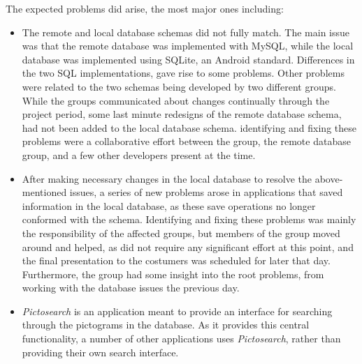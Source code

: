 The expected problems did arise, the most major ones including:
\begin{itemize}
	\item The remote and local database schemas did not fully match. The main issue was that the remote database was implemented with MySQL, while the local database was implemented using SQLite, an Android standard. Differences in the two SQL implementations, gave rise to some problems. Other problems were related to the two schemas being developed by two different groups. While the groups communicated about changes continually through the project period, some last minute redesigns of the remote database schema, had not been added to the local database schema. identifying and fixing these problems were a collaborative effort between the \launcher group, the remote database group, and a few other developers present at the time. 
	\item After making necessary changes in the local database to resolve the above-mentioned issues, a series of new problems arose in applications that saved information in the local database, as these save operations no longer conformed with the schema. Identifying and fixing these problems was mainly the responsibility of the affected groups, but members of the \launcher group moved around and helped, as \launcher did not require any significant effort at this point, and the final presentation to the costumers was scheduled for later that day. Furthermore, the \launcher group had some insight into the root problems, from working with the database issues the previous day.
	\item \textit{Pictosearch} is an application meant to provide an interface for searching through the pictograms in the database. As it provides this central functionality, a number of other applications uses \textit{Pictosearch}, rather than providing their own search interface.
\end{itemize}

